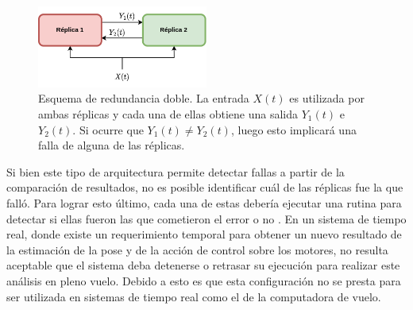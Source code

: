 \begin{figure}[htb]
    \centering
    \includegraphics[width=0.5\textwidth]{img/redundancia_doble.png}
    \caption{Esquema de redundancia doble. La entrada $X(t)$ es utilizada por ambas réplicas y cada una de ellas obtiene una salida $Y_1(t)$ e $Y_2(t)$. Si ocurre que $Y_1(t) \neq Y_2(t)$, luego esto implicará una falla de alguna de las réplicas. }
    \label{fig:redundancia_doble}
\end{figure}


Si bien este tipo de arquitectura permite detectar fallas a partir de la comparación de resultados, no es posible identificar cuál de las réplicas fue la que falló. Para lograr esto último, cada una de estas debería ejecutar una rutina para detectar si ellas fueron las que cometieron el error o no \cite{baleani2003fault}. En un sistema de tiempo real, donde existe un requerimiento temporal para obtener un nuevo resultado de la estimación de la pose y de la acción de control sobre los motores, no resulta aceptable que el sistema deba detenerse o retrasar su ejecución para realizar este análisis en pleno vuelo. Debido a esto es que esta configuración no se presta para ser utilizada en sistemas de tiempo real como el de la computadora de vuelo.


